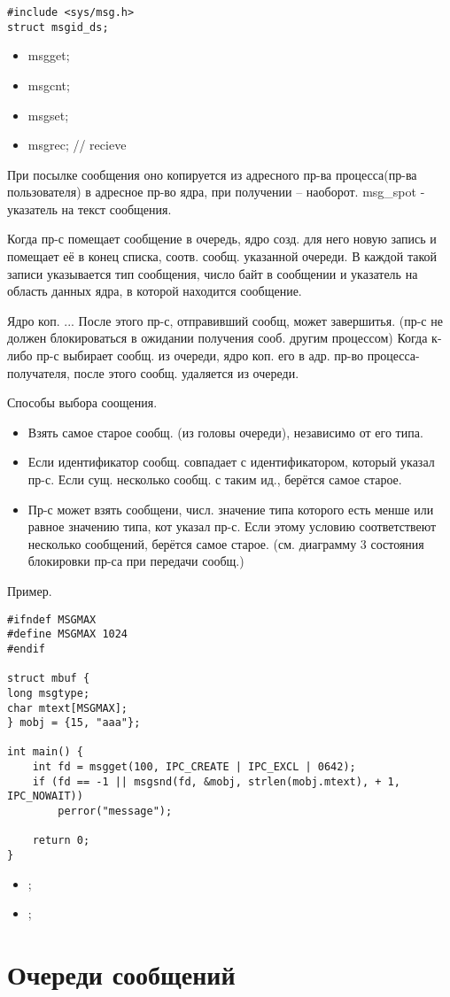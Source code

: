 \begin{lstlisting}
#include <sys/msg.h>
struct msgid_ds;
\end{lstlisting}

\begin{itemize}
	\item msgget;
	\item msgcnt;
	\item msgset;
	\item msgrec; // recieve
\end{itemize}

При посылке сообщения оно копируется из адресного пр-ва процесса(пр-ва пользователя) в адресное пр-во ядра, при получении -- наоборот.
msg\_spot - указатель на текст сообщения. 

Когда пр-с помещает сообщение  в очередь, ядро созд. для него новую запись и помещает её в конец списка, соотв. сообщ. указанной очереди. В каждой такой записи указывается тип сообщения, число байт в сообщении и указатель на область данных ядра, в которой находится сообщение.

Ядро коп. ... После этого пр-с, отправивший сообщ, может завершитья. (пр-с не должен блокироваться в ожидании получения сооб. другим процессом)
Когда к-либо пр-с выбирает сообщ. из очереди, ядро коп. его в адр. пр-во процесса-получателя, после этого сообщ. удаляется из очереди.

Способы выбора соощения.
\begin{itemize}
	\item Взять самое старое сообщ. (из головы очереди), независимо от его типа.
	\item Если идентификатор сообщ. совпадает с идентификатором, который указал пр-с. Если сущ. несколько сообщ. с таким ид., берётся самое старое.
	\item Пр-с может взять сообщени, числ. значение типа которого есть менше или равное значению типа, кот указал пр-с. Если этому условию соответствеют несколько сообщений, берётся самое старое. (см. диаграмму 3 состояния блокировки пр-са при передачи сообщ.)
\end{itemize}

Пример.
\begin{lstlisting}
#ifndef MSGMAX
#define MSGMAX 1024
#endif

struct mbuf {
long msgtype;
char mtext[MSGMAX];
} mobj = {15, "aaa"};

int main() {
	int fd = msgget(100, IPC_CREATE | IPC_EXCL | 0642);
	if (fd == -1 || msgsnd(fd, &mobj, strlen(mobj.mtext), + 1, IPC_NOWAIT))
		perror("message");
	
	return 0;
}
\end{lstlisting}

\begin{itemize}
	\item ;
	\item ;
\end{itemize}
\chapter{Очереди сообщений}